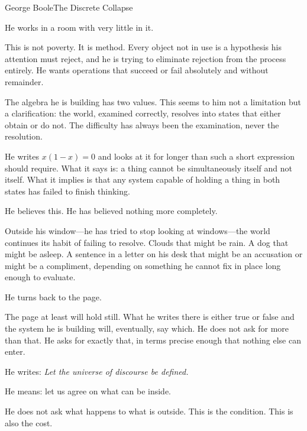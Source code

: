 
\begin{formalecho}{George Boole}{The Discrete Collapse}

He works in a room with very little in it.

This is not poverty. It is method. Every object not in use is a
hypothesis his attention must reject, and he is trying to eliminate
rejection from the process entirely. He wants operations that
succeed or fail absolutely and without remainder.

The algebra he is building has two values. This seems to him not a
limitation but a clarification: the world, examined correctly,
resolves into states that either obtain or do not. The difficulty
has always been the examination, never the resolution.

He writes $x(1-x)=0$ and looks at it for longer than such a short
expression should require. What it says is: a thing cannot be
simultaneously itself and not itself. What it implies is that any
system capable of holding a thing in both states has failed to
finish thinking.

He believes this. He has believed nothing more completely.

Outside his window---he has tried to stop looking at windows---the
world continues its habit of failing to resolve. Clouds that might
be rain. A dog that might be asleep. A sentence in a letter on his
desk that might be an accusation or might be a compliment,
depending on something he cannot fix in place long enough to
evaluate.

He turns back to the page.

The page at least will hold still. What he writes there is either
true or false and the system he is building will, eventually, say
which. He does not ask for more than that. He asks for exactly
that, in terms precise enough that nothing else can enter.

He writes: \textit{Let the universe of discourse be defined.}

He means: let us agree on what can be inside.

He does not ask what happens to what is outside. This is the
condition. This is also the cost.

\end{formalecho}
